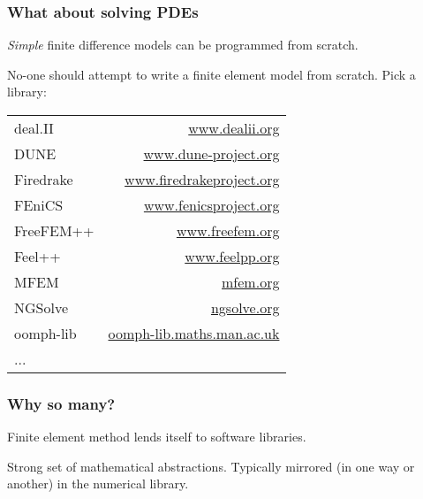 \documentclass[presentation]{beamer}
\begin{document}
\begin{frame}
  \frametitle{What about solving PDEs}
  \emph{Simple} finite difference models can be programmed from scratch.

  No-one should attempt to write a finite element model from
  scratch. Pick a library:
  \begin{center}
    \small
    \begin{tabular}{lr}
      deal.II   & \url{www.dealii.org}            \\
      DUNE      & \url{www.dune-project.org}      \\
      Firedrake & \url{www.firedrakeproject.org}  \\
      FEniCS    & \url{www.fenicsproject.org}     \\
      FreeFEM++ & \url{www.freefem.org}           \\
      Feel++    & \url{www.feelpp.org}            \\
      MFEM      & \url{mfem.org}                  \\
      NGSolve   & \url{ngsolve.org}               \\
      oomph-lib & \url{oomph-lib.maths.man.ac.uk} \\
      ...       &                                 \\
    \end{tabular}
  \end{center}
\end{frame}

\begin{frame}
  \frametitle{Why so many?}
  Finite element method lends itself to software libraries.
  
  Strong set of mathematical abstractions.  Typically mirrored (in one
  way or another) in the numerical library.
\end{frame}
\end{document}
